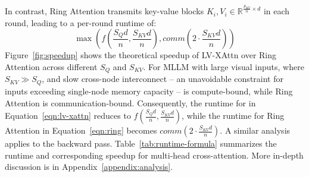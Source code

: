 In contrast, Ring Attention transmits key-value blocks $K_i, V_i \in \mathbb{R}^{\frac{S_{KV}}{n} \times d}$ in each round, leading to a per-round runtime of:
\begin{equation} \label{eqn:ring}
    \max\left(f(\frac{S_Qd}{n}, \frac{S_{KV}d}{n}), comm(2\cdot\frac{S_{KV}d}{n})\right)
\end{equation}
Figure~\ref{fig:speedup} shows the theoretical speedup of LV-XAttn over Ring Attention across different $S_Q$ and $S_{KV}$. For MLLM with large visual inputs, where $S_{KV} \gg S_Q$, and slow cross-node interconnect -- an unavoidable constraint for inputs exceeding single-node memory capacity --  is compute-bound, while Ring Attention is communication-bound. Consequently, the runtime for  in Equation~\ref{eqn:lv-xattn} reduces to $f\left(\frac{S_Qd}{n}, \frac{S_{KV}d}{n}\right)$, while the runtime for Ring Attention in Equation~\ref{eqn:ring} becomes $comm\left(2\cdot\frac{S_{KV}d}{n}\right)$. A similar analysis applies to the backward pass. Table~\ref{tab:runtime-formula} summarizes the runtime and corresponding speedup for multi-head cross-attention. More in-depth discussion is in Appendix~\ref{appendix:analysis}.




